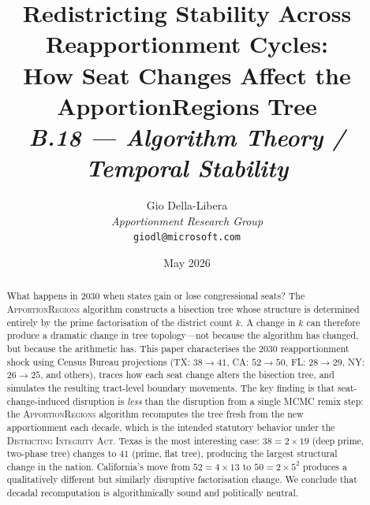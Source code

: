 \documentclass[12pt]{article}
\title{%
  \textbf{Redistricting Stability Across Reapportionment Cycles:}\\
  \textbf{How Seat Changes Affect the ApportionRegions Tree}\\[0.8em]
  \normalsize\textit{B.18 --- Algorithm Theory / Temporal Stability}%
}
\author{%
  Gio Della-Libera\\
  \textit{Apportionment Research Group}\\
  \small\texttt{giodl@microsoft.com}
}
\date{May 2026}
\newcommand{\ar}{\textsc{ApportionRegions}}
\newcommand{\dia}{\textsc{Districting Integrity Act}}
\begin{document}
\maketitle

\begin{abstract}
\noindent
What happens in 2030 when states gain or lose congressional seats?
The \ar{} algorithm constructs a bisection tree whose structure is
determined entirely by the prime factorisation of the district count $k$.
A change in $k$ can therefore produce a dramatic change in tree
topology---not because the algorithm has changed, but because the
arithmetic has.
This paper characterises the 2030 reapportionment shock using
Census Bureau projections (TX: $38 \to 41$, CA: $52 \to 50$,
FL: $28 \to 29$, NY: $26 \to 25$, and others), traces how
each seat change alters the bisection tree, and simulates
the resulting tract-level boundary movements.
The key finding is that seat-change-induced disruption is
\emph{less} than the disruption from a single MCMC remix step:
the \ar{} algorithm recomputes the tree fresh from the new
apportionment each decade, which is the intended statutory
behavior under the \dia{}.
Texas is the most interesting case: $38 = 2 \times 19$ (deep prime,
two-phase tree) changes to $41$ (prime, flat tree), producing
the largest structural change in the nation.
California's move from $52 = 4 \times 13$ to $50 = 2 \times 5^2$
produces a qualitatively different but similarly disruptive
factorisation change.
We conclude that decadal recomputation is algorithmically sound
and politically neutral.
\end{abstract}

\tableofcontents
\newpage











\end{document}
